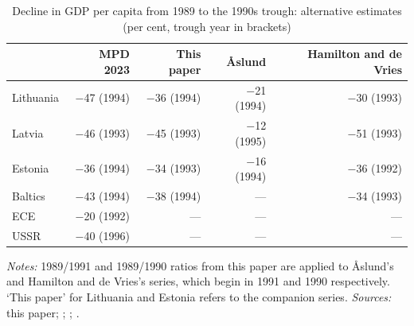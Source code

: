 \begin{table}[htbp]
\centering\footnotesize
\caption{Decline in GDP per capita from 1989 to the 1990s trough: alternative estimates (per cent, trough year in brackets)}
\label{tab:transition}
\begin{threeparttable}
\begin{tabular}{lrrrr}
\toprule
& MPD 2023 & This paper & \AA{}slund & Hamilton and de Vries \\
\midrule
Lithuania & $-$47 (1994) & $-$36 (1994) & $-$21 (1994) & $-$30 (1993) \\
Latvia & $-$46 (1993) & $-$45 (1993) & $-$12 (1995) & $-$51 (1993) \\
Estonia & $-$36 (1994) & $-$34 (1993) & $-$16 (1994) & $-$36 (1992) \\
\midrule
Baltics & $-$43 (1994) & $-$38 (1994) & --- & $-$34 (1993) \\
ECE & $-$20 (1992) & --- & --- & --- \\
USSR & $-$40 (1996) & --- & --- & --- \\
\bottomrule
\end{tabular}
\begin{tablenotes}
\footnotesize
\textit{Notes:} 1989/1991 and 1989/1990 ratios from this paper are applied to \AA{}slund's and Hamilton and de Vries's series, which begin in 1991 and 1990 respectively. `This paper' for Lithuania and Estonia refers to the companion series. \textit{Sources:} this paper; \textcite{mpd2023}; \textcite[15]{aslund_myth}; \textcite{hamilton_transition}.
\end{tablenotes}
\end{threeparttable}
\end{table}
